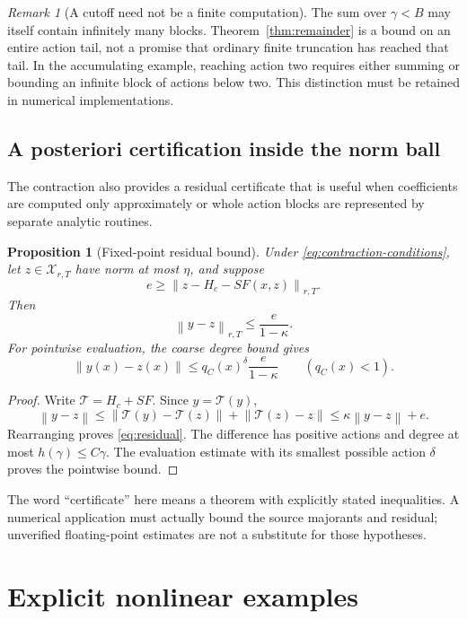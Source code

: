 \documentclass[11pt,a4paper]{article}
\numberwithin{equation}{section}
\newtheorem{proposition}[theorem]{Proposition}
\theoremstyle{definition}
\theoremstyle{remark}
\newtheorem{remark}[theorem]{Remark}
\newcommand{\norm}[1]{\left\lVert #1\right\rVert}
\begin{document}
\begin{remark}[A cutoff need not be a finite computation]
The sum over \(\gamma<B\) may itself contain infinitely many blocks.
Theorem~\ref{thm:remainder} is a bound on an entire action tail, not a
promise that ordinary finite truncation has reached that tail. In the
accumulating example, reaching action two requires either summing or
bounding an infinite block of actions below two. This distinction must
be retained in numerical implementations.
\end{remark}

\subsection{A posteriori certification inside the norm ball}
The contraction also provides a residual certificate that is useful
when coefficients are computed only approximately or whole action
blocks are represented by separate analytic routines.

\begin{proposition}[Fixed-point residual bound]\label{prop:residual}
Under \eqref{eq:contraction-conditions}, let
\(z\in\mathcal X_{r,T}\) have norm at most \(\eta\), and suppose
\[
 e\ge\norm{z-H_c-SF(x,z)}_{r,T}.
\]
Then
\begin{equation}\label{eq:residual}
 \norm{y-z}_{r,T}\le\frac{e}{1-\kappa}.
\end{equation}
For pointwise evaluation, the coarse degree bound gives
\[
 \norm{y(x)-z(x)}
 \le q_C(x)^\delta\frac{e}{1-\kappa}
 \qquad(q_C(x)<1).
\]
\end{proposition}
\begin{proof}
Write \(\mathcal T=H_c+SF\). Since \(y=\mathcal T(y)\),
\[
 \norm{y-z}\le\norm{\mathcal T(y)-\mathcal T(z)}
                   +\norm{\mathcal T(z)-z}
 \le\kappa\norm{y-z}+e.
\]
Rearranging proves \eqref{eq:residual}. The difference has positive
actions and degree at most \(h(\gamma)\le C\gamma\). The evaluation
estimate with its smallest possible action \(\delta\) proves the
pointwise bound.
\end{proof}

The word ``certificate'' here means a theorem with explicitly stated
inequalities. A numerical application must actually bound the source
majorants and residual; unverified floating-point estimates are not
a substitute for those hypotheses.

\section{Explicit nonlinear examples}
\label{sec:examples}
\end{document}
